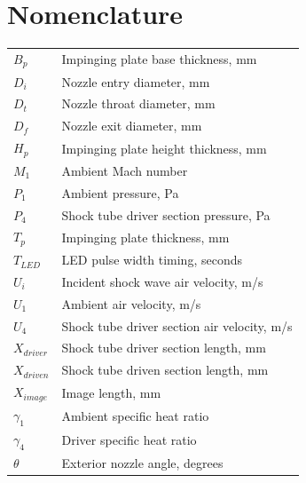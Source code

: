 \section*{Nomenclature}
\begin{table}[H]
\begin{tabular}{ll} \smallskip
$B_p$      & Impinging plate base thickness, mm          \\ \smallskip
$D_i$      & Nozzle entry diameter, mm                   \\ \smallskip
$D_t$      & Nozzle throat diameter, mm                  \\ \smallskip
$D_f$      & Nozzle exit diameter, mm                    \\ \smallskip
$H_p$      & Impinging plate height thickness, mm          \\ \smallskip
$M_1$      & Ambient Mach number                         \\ \smallskip
$P_1$      & Ambient pressure, Pa                        \\ \smallskip
$P_4$      & Shock tube driver section pressure, Pa      \\ \smallskip
$T_p$      & Impinging plate thickness, mm               \\ \smallskip
$T_{LED}$      & LED pulse width timing, seconds         \\ \smallskip
$U_i$      & Incident shock wave air velocity, m/s       \\ \smallskip
$U_1$      & Ambient air velocity, m/s                   \\ \smallskip
$U_4$      & Shock tube driver section air velocity, m/s \\ \smallskip
$X_{driver}$      & Shock tube driver section length, mm   \\ \smallskip
$X_{driven}$      & Shock tube driven section length, mm   \\ \smallskip
$X_{image}$      & Image length, mm                      \\ \smallskip
$\gamma_1$ & Ambient specific heat ratio                 \\ \smallskip
$\gamma_4$ & Driver specific heat ratio                  \\ \smallskip
$\theta$   & Exterior nozzle angle, degrees   
\end{tabular}
\end{table}
 
